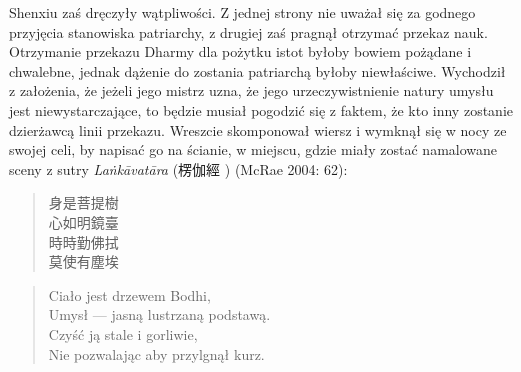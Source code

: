 Shenxiu zaś dręczyły wątpliwości. Z jednej strony nie uważał się za godnego przyjęcia stanowiska patriarchy, z drugiej zaś pragnął otrzymać przekaz nauk. Otrzymanie przekazu Dharmy dla pożytku istot byłoby bowiem pożądane i chwalebne, jednak dążenie do zostania patriarchą byłoby niewłaściwe. Wychodził z założenia, że jeżeli jego mistrz uzna, że jego urzeczywistnienie natury umysłu jest niewystarczające, to będzie musiał pogodzić się z faktem, że kto inny zostanie dzierżawcą linii przekazu. Wreszcie skomponował wiersz i wymknął się w nocy ze swojej celi, by napisać go na ścianie, w miejscu, gdzie miały zostać namalowane sceny z sutry \textit{La\.nkāvatāra} (楞伽經 ) (McRae 2004: 62):

\vspace*{6pt}
\begin{minipage}[t]{0.4\textwidth}
\begin{verse}
身是菩提樹\\
心如明鏡臺\\
時時勤佛拭\\
莫使有塵埃
\end{verse}
\end{minipage}
\begin{minipage}[t]{0.6\textwidth}
\itshape
\begin{verse}
Ciało jest drzewem Bodhi,\\
Umysł --- jasną lustrzaną podstawą.\\
Czyść ją stale i gorliwie,\\
Nie pozwalając aby przylgnął kurz.\fnm
\end{verse}
\end{minipage}
\label{ShenxiuVerse}
\vspace*{6pt}

